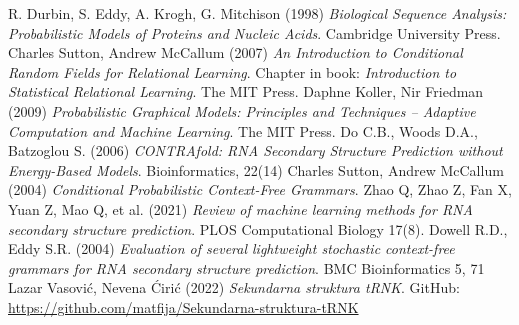 \documentclass[a4paper, 12pt]{article}
\begin{document}
\newpage 

\begin{thebibliography}{9}
\bibitem{} R. Durbin, S. Eddy, A. Krogh, G. Mitchison (1998) \textit{Biological Sequence Analysis: Probabilistic Models of Proteins and Nucleic Acids}. Cambridge University Press.
\bibitem{} Charles Sutton, Andrew McCallum (2007) \textit{An Introduction to Conditional Random Fields for Relational Learning}. Chapter in book: \textit{Introduction to Statistical Relational Learning}. The MIT Press.
\bibitem{} Daphne Koller, Nir Friedman (2009) \textit{Probabilistic Graphical Models: Principles and Techniques -- Adaptive Computation and Machine Learning}. The MIT Press.
\bibitem{} Do C.B., Woods D.A., Batzoglou S. (2006) \textit{CONTRAfold: RNA Secondary Structure Prediction without Energy-Based Models}. Bioinformatics, 22(14)
\bibitem{} Charles Sutton, Andrew McCallum (2004) \textit{Conditional Probabilistic Context-Free Grammars}.
\bibitem{} Zhao Q, Zhao Z, Fan X, Yuan Z, Mao Q, et al. (2021) \textit{Review of machine learning methods for RNA secondary structure prediction}. PLOS Computational Biology 17(8).
\bibitem{} Dowell R.D., Eddy S.R. (2004) \textit{Evaluation of several lightweight stochastic context-free grammars for RNA secondary structure prediction}. BMC Bioinformatics 5, 71
\bibitem{} Lazar Vasović, Nevena Ćirić (2022) \textit{Sekundarna struktura tRNK}. GitHub: \url{https://github.com/matfija/Sekundarna-struktura-tRNK}
\end{thebibliography}
\end{document}
